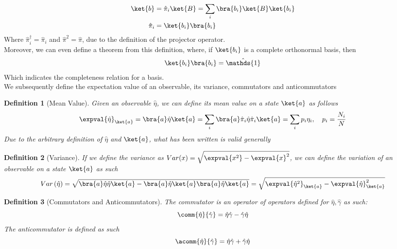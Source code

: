 \documentclass[a4paper, 11pt]{book}
\newcommand{\1}{\opr{\mathds{1}}}
\newcommand{\opr}[1]{\hat{#1}}
\newcommand{\adj}[2][]{#2^{\dagger#1}}
\theoremstyle{plain}
\newtheorem{defn}{Definition}
\begin{document}
	\begin{equation}
		\begin{aligned}
			\ket{b}&=\opr{\pi}_i\ket{B}=\sum_i\bra{b_i}\ket{B}\ket{b_i}\\
			\opr{\pi}_i&=\ket{b_i}\bra{b_i}
		\end{aligned}
		\label{eq:projection}
	\end{equation}
	Where $\adj{\opr{\pi}_i}=\opr{\pi}_i$ and $\opr{\pi}^2=\opr{\pi}$, due to the definition of the projector operator.\\
	Moreover, we can even define a theorem from this definition, where, if $\ket{b_i}$ is a complete orthonormal basis, then
	\begin{equation}
		\ket{b_i}\bra{b_i}=\1
		\label{eq:completeness}
	\end{equation}
	Which indicates the completeness relation for a basis.\\
	We subsequently define the expectation value of an observable, its variance, commutators and anticommutators
	\begin{defn}[Mean Value]
		Given an observable $\opr{\eta}$, we can define its mean value on a state $\ket{a}$ as follows
		\begin{equation}
			\expval{\opr{\eta}}_{\ket{a}}=\bra{a}\opr{\eta}\ket{a}=\sum_i\bra{a}\opr{\pi}_i\opr{\eta}\opr{\pi}_i\ket{a}=\sum_ip_i\eta_i,\quad p_i=\frac{N_i}{N}
			\label{eq:expval}
		\end{equation}
		Due to the arbitrary definition of $\opr{\eta}$ and $\ket{a}$, what has been written is valid generally
	\end{defn}
	\begin{defn}[Variance]
		If we define the variance as $Var(x)=\sqrt{\expval{x^2}-\expval{x}^2}$, we can define the variation of an observable on a state $\ket{a}$ as such
		\begin{equation}
			Var\left(\opr{\eta}\right)=\sqrt{\bra{a}\opr{\eta}\opr{\eta}\ket{a}-\bra{a}\opr{\eta}\ket{a}\bra{a}\opr{\eta}\ket{a}}=\sqrt{\expval{\opr{\eta}^2}_{\ket{a}}-\expval{\opr{\eta}}_{\ket{a}}^2}
			\label{eq:variance}
		\end{equation}
	\end{defn}
	\begin{defn}[Commutators and Anticommutators]
		The commutator is an operator of operators defined for $\opr{\eta},\opr{\gamma}$ as such:
		\begin{equation}
			\comm{\opr{\eta}}{\opr{\gamma}}=\opr{\eta}\opr{\gamma}-\opr{\gamma}\opr{\eta}
			\label{eq:commutator}
		\end{equation}
		The anticommutator is defined as such
		\begin{equation}
			\acomm{\opr{\eta}}{\opr{\gamma}}=\opr{\eta}\opr{\gamma}+\opr{\gamma}\opr{\eta}
			\label{eq:anticommutator}
		\end{equation}
	\end{defn}
\end{document}
